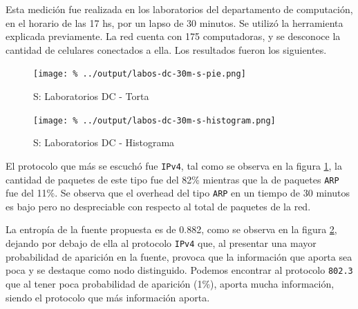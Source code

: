 \documentclass[final,inline,a4paper,narroweqnarray]{ieee}
\begin{document}
    Esta medición fue realizada en los laboratorios del departamento de
    computación, en el horario de las 17 hs, por un lapso de 30 minutos.
    Se utilizó la herramienta explicada previamente. La red cuenta con 175
    computadoras, y se desconoce la cantidad de celulares conectados a ella.
    Los resultados fueron los siguientes.
   
    \begin{figure}[ht]\begin{center}
      \texttt{[image: \%
      ../output/labos-dc-30m-s-pie.png]}
      \vspace{-3em}
      \caption{S: Laboratorios DC - Torta}
      \label{labos-dc-30m-s-pie}
    \end{center}\end{figure}

    \begin{figure}[ht]\begin{center}
      \texttt{[image: \%
      ../output/labos-dc-30m-s-histogram.png]}
      \caption{S: Laboratorios DC - Histograma}
      \label{labos-dc-30m-s-histogram}
    \end{center}\end{figure}


  El protocolo que más se escuchó fue \texttt{IPv4}, tal como se
  observa en la figura \ref{labos-dc-30m-s-pie}, la cantidad de
  paquetes  de este tipo fue del 82\% mientras que la de paquetes
  \texttt{ARP} fue del 11\%. Se observa que el overhead del tipo \texttt{ARP} 
  en un tiempo de 30 minutos es bajo pero no despreciable con respecto al 
  total de paquetes de la red.

  La entropía de la fuente propuesta es de 0.882, como se observa en la
  figura \ref{labos-dc-30m-s-histogram}, dejando por debajo de ella al
  protocolo \texttt{IPv4} que, al presentar una mayor probabilidad de
  aparición en la fuente, provoca que la información que aporta sea
  poca y se destaque como nodo distinguido. Podemos encontrar al protocolo 
  \texttt{802.3} que al tener poca probabilidad de aparición
  (1\%), aporta mucha información, siendo el protocolo que más información
  aporta.

\end{document}
